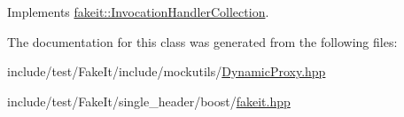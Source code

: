 Implements \mbox{\hyperlink{structfakeit_1_1InvocationHandlerCollection_aa0bb622369d838f8c4daa93a8b992b57}{fakeit\+::\+Invocation\+Handler\+Collection}}.



The documentation for this class was generated from the following files\+:\begin{DoxyCompactItemize}
\item 
include/test/\+Fake\+It/include/mockutils/\mbox{\hyperlink{DynamicProxy_8hpp}{Dynamic\+Proxy.\+hpp}}\item 
include/test/\+Fake\+It/single\+\_\+header/boost/\mbox{\hyperlink{single__header_2boost_2fakeit_8hpp}{fakeit.\+hpp}}\end{DoxyCompactItemize}
